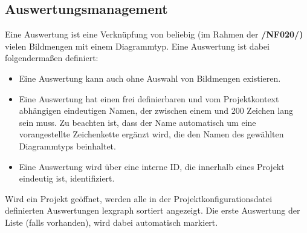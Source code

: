 \subsection{Auswertungsmanagement}

\label{subsec:auswertungsmgmt}

	Eine Auswertung ist eine Verknüpfung von beliebig (im Rahmen der \textbf{/NF020/)} vielen Bildmengen mit einem Diagrammtyp. Eine Auswertung ist dabei folgendermaßen definiert:

	\begin{itemize}

		\item Eine Auswertung kann auch ohne Auswahl von Bildmengen existieren. 

		\item Eine Auswertung hat einen frei definierbaren und vom Projektkontext abhängigen eindeutigen Namen, der zwischen einem und 200 Zeichen lang sein muss. Zu beachten ist, dass der Name automatisch um eine vorangestellte Zeichenkette ergänzt wird, die den Namen des gewählten Diagrammtyps beinhaltet.

		\item Eine Auswertung wird über eine interne ID, die innerhalb eines Projekt eindeutig ist, identifiziert.

	\end{itemize}

	Wird ein Projekt geöffnet, werden alle in der Projektkonfigurationsdatei definierten Auswertungen \gls{lexgraph} sortiert angezeigt. Die erste Auswertung der Liste (falls vorhanden), wird dabei automatisch markiert.

